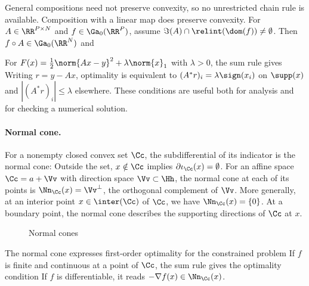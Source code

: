 General compositions need not preserve convexity, so no unrestricted chain rule is available.
%
Composition with a linear map does preserve convexity. For $A \in \RR^{P \times N}$ and $f \in \Ga_0(\RR^P)$, assume $\Im(A)\cap\relint(\dom(f))\neq\emptyset$. Then $f \circ A \in \Ga_0(\RR^N)$ and

\begin{rem}
For $F(x)=\frac12\norm{Ax-y}^2+\lambda\norm{x}_1$ with $\lambda>0$, the sum rule gives
Writing $r=y-Ax$, optimality is equivalent to $(A^*r)_i=\lambda\sign(x_i)$ on $\supp(x)$ and $|(A^*r)_i|\leq\lambda$ elsewhere. These conditions are useful both for analysis and for checking a numerical solution.
\end{rem}

\paragraph{Normal cone.}


For a nonempty closed convex set $\Cc$, the subdifferential of its indicator is the normal cone:
Outside the set, $x \notin \Cc$ implies $\partial  \iota_\Cc(x) = \emptyset$.
%
For an affine space $\Cc = a+\Vv$ with direction space $\Vv \subset \Hh$, the normal cone at each of its points is $\Nn_\Cc(x)=\Vv^\bot$, the orthogonal complement of $\Vv$. More generally, at an interior point $x \in \inter(\Cc)$ of $\Cc$, we have $\Nn_\Cc(x)=\{0\}$. At a boundary point, the normal cone describes the supporting directions of $\Cc$ at $x$.






\begin{figure}[tbp]
\centering
{}
\caption{Normal cones}
\label{fig-review-convex-analysis-normal-cones}
\end{figure}
The normal cone expresses first-order optimality for the constrained problem
If $f$ is finite and continuous at a point of $\Cc$, the sum rule gives the optimality condition
If $f$ is differentiable, it reads $-\nabla f(x) \in \Nn_\Cc(x)$.



